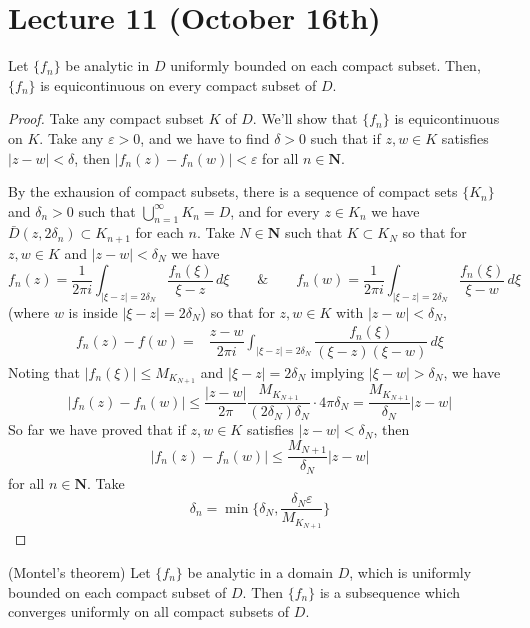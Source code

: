 \section{Lecture 11 (October 16th)}
\begin{thm}
Let $\{f_{n}\}$ be analytic in $D$ uniformly bounded on each compact subset. Then, $\{f_{n}\}$ is equicontinuous on every compact subset of $D$.
\end{thm}
\vspace{2ex}
\begin{proof}
Take any compact subset $K$ of $D$. We'll show that $\{f_{n}\}$ is equicontinuous on $K$. Take any $\varepsilon >0$, and we have to find $\delta >0$ such that if $z,w\in K$ satisfies $|z-w|<\delta $, then $|f_{n}(z)-f_{n}(w)|<\varepsilon $ for all $n\in {\bm N}$.

\bigskip

By the exhausion of compact subsets, there is a sequence of compact sets $\{K_{n}\}$ and $\delta _{n}>0$ such that $\bigcup ^{\infty }_{n=1} K_{n}=D$, and for every $z\in K_{n}$ we have $\bar{D}(z,2\delta _{n})\subset K_{n+1}$ for each $n$. Take $N\in {\bm N}$ such that $K\subset K_{N}$ so that for $z,w\in K$ and $|z-w|<\delta _{N}$ we have 
\[f_{n}(z)=\dfrac{1}{2\pi i}\int _{|\xi -z|=2\delta _{N}}\dfrac{f_{n}(\xi )}{\xi -z}\,d\xi \qquad\&\qquad f_{n}(w)=\dfrac{1}{2\pi i}\int _{|\xi -z|=2\delta _{N}}\dfrac{f_{n}(\xi )}{\xi -w}\,d\xi \]
(where $w$ is inside $|\xi -z|=2\delta _{N}$) so that for $z,w\in K$ with $|z-w|<\delta _{N}$,
\[\begin{align*}
f_{n}(z)-f(w)=&\dfrac{z-w}{2\pi i}\int _{|\xi -z|=2\delta _{N}}\dfrac{f_{n}(\xi )}{(\xi -z)(\xi -w)}\,d\xi 
\end{align*}\]
Noting that $|f_{n}(\xi )|\leq M_{K_{N+1}}$ and $|\xi -z|=2\delta _{N}$ implying $|\xi -w|>\delta _{N}$, we have
\[|f_{n}(z)-f_{n}(w)|\leq\dfrac{|z-w|}{2\pi }\dfrac{M_{K_{N+1}}}{(2\delta _{N})\delta _{N}}\cdot 4\pi \delta _{N}=\dfrac{M_{K_{N+1}}}{\delta _{N}}|z-w|\]
So far we have proved that if $z,w\in K$ satisfies $|z-w|<\delta _{N}$, then 
\[|f_{n}(z)-f_{n}(w)|\leq \dfrac{M_{N+1}}{\delta_{N}}|z-w|\]
for all $n\in {\bm N}$. Take
\[\delta _{n}=\min \Big\{ \delta _{N},\dfrac{\delta _{N}\varepsilon }{M_{K_{N+1}}} \Big\}\]
\end{proof}
\vspace{2ex}
\begin{thm}
(Montel's theorem) Let $\{f_{n}\}$ be analytic in a domain $D$, which is uniformly bounded on each compact subset of $D$. Then $\{f_{n}\}$ is a subsequence which converges uniformly on all compact subsets of $D$. 
\end{thm}
